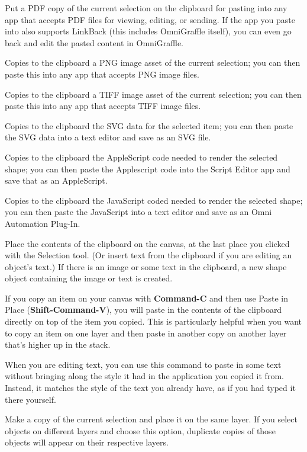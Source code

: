 \documentclass[../main.tex]{subfiles}
\begin{document}
\begin{description}[style=nextline]
    \begin{description}[style=nextline]
      \item[{PDF}] Put a PDF copy of the current selection on the clipboard for pasting into any
        app that accepts PDF files for viewing, editing, or sending. If the app you paste into
        also supports LinkBack (this includes OmniGraffle itself), you can even go back and edit
        the pasted content in OmniGraffle.
      \item[{PNG}] Copies to the clipboard a PNG image asset of the current selection; you can
        then paste this into any app that accepts PNG image files.
      \item[{TIFF}] Copies to the clipboard a TIFF image asset of the current selection; you can
        then paste this into any app that accepts TIFF image files.
      \item[{SVG}] Copies to the clipboard the SVG data for the selected item; you can then paste
        the SVG data into a text editor and save as an SVG file.
      \item[{AppleScript}] Copies to the clipboard the AppleScript code needed to render the
        selected shape; you can then paste the Applescript code into the Script Editor app and
        save that as an AppleScript.
      \item[{JavaScript}] Copies to the clipboard the JavaScript coded needed to render the
        selected shape; you can then paste the JavaScript into a text editor and save as an Omni
        Automation Plug-In.
    \end{description}
  \item[{Paste (\textbf{Command-V})}] Place the contents of the clipboard on the canvas, at the
    last place you clicked with the Selection tool. (Or insert text from the clipboard if you
    are editing an object's text.) If there is an image or some text in the clipboard, a new
    shape object containing the image or text is created.
  \item[{Paste in Place (\textbf{Shift-Command-V})}] If you copy an item on your canvas with
    \textbf{Command-C} and then use Paste in Place (\textbf{Shift-Command-V}), you will paste in
    the contents of the clipboard directly on top of the item you copied. This is particularly
    helpful when you want to copy an item on one layer and then paste in another copy on another
    layer that's higher up in the stack.
  \item[{Paste and Match Style (\textbf{Option-Shift-Command-V})}] When you are editing text,
    you can use this command to paste in some text without bringing along the style it had in
    the application you copied it from. Instead, it matches the style of the text you already
    have, as if you had typed it there yourself.
  \item[{Duplicate and Maintain Layers (\textbf{Command-D})}] Make a copy of the current
    selection and place it on the same layer. If you select objects on different layers and
    choose this option, duplicate copies of those objects will appear on their respective
    layers.


\end{description}
\end{document}
